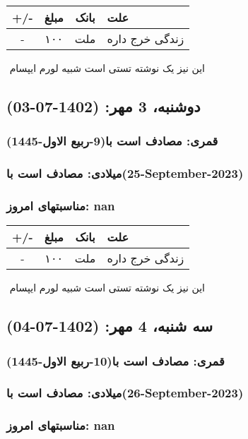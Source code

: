 \documentclass{article}
\newcommand{\rnote}[1]{\marginpar{\textcolor{color}{\StrSubstitute{\##1}{ }{\_}}}}
\newcommand{\myRow}[4]{
    #1 & #2 & #3 & #4 \\ \hline
}
\begin{document}
\begin{tabular}{ | c | c | c | p{5cm} |}
    \hline
    \myRow{ +/- }{مبلغ}{بانک}{علت}
    \myRow{-}{۱۰۰}{ملت}{زندگی خرج داره}
\end{tabular}
\newline
\newline

‌
\rnote{تست}
این نیز یک نوشته تستی است شبیه لورم ایپسام




\newpage
{}
\textcolor{color}{
\section{ دوشنبه، 3 مهر: (1402-07-03) }
\subsubsection*{قمری: مصادف است با(9-ربیع الاول-1445)} 
\subsubsection*{میلادی: مصادف است با(25-September-2023)}
\subsubsection*{مناسبتهای امروز: nan}
}


\begin{tabular}{ | c | c | c | p{5cm} |}
    \hline
    \myRow{ +/- }{مبلغ}{بانک}{علت}
    \myRow{-}{۱۰۰}{ملت}{زندگی خرج داره}
\end{tabular}
\newline
\newline

‌
\rnote{تست}
این نیز یک نوشته تستی است شبیه لورم ایپسام




\newpage
{}
\textcolor{color}{
\section{ سه شنبه، 4 مهر: (1402-07-04) }
\subsubsection*{قمری: مصادف است با(10-ربیع الاول-1445)} 
\subsubsection*{میلادی: مصادف است با(26-September-2023)}
\subsubsection*{مناسبتهای امروز: nan}
}
\end{document}
